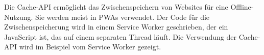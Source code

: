 
Die Cache-API ermöglicht das Zwischenspeichern von Websites für eine Offline-Nutzung. Sie werden meist in PWAs verwendet. Der Code für die Zwischenspeicherung wird in einem Service Worker geschrieben, der ein JavaScript ist, das auf einem separaten Thread läuft. Die Verwendung der Cache-API wird im Beispiel vom Service Worker gezeigt.